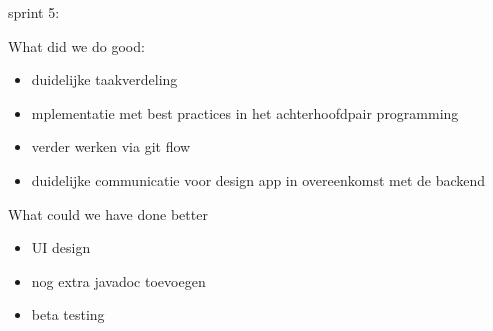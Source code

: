 sprint 5:

What did we do good:

\begin{itemize}
\item duidelijke taakverdeling
\item mplementatie met best practices in het achterhoofdpair programming
\item verder werken via git flow
\item duidelijke communicatie voor design app in overeenkomst met de backend
\end{itemize}

What could we have done better

\begin{itemize}
\item UI design
\item nog extra javadoc toevoegen
\item beta testing
\end{itemize}
